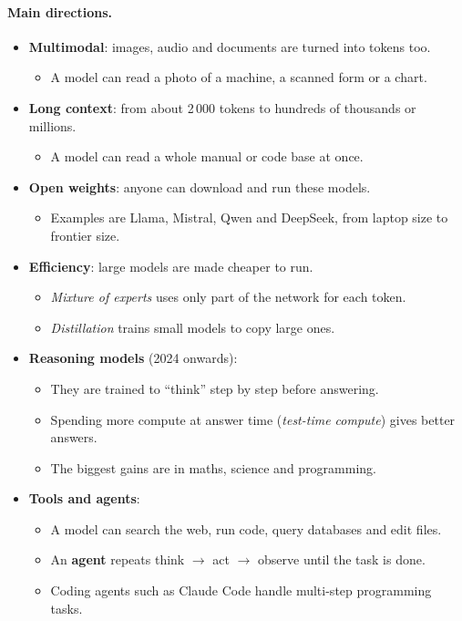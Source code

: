 \documentclass[12pt, a4paper]{article}
\begin{document}
\paragraph{Main directions.}
\begin{itemize}
  \item \textbf{Multimodal}: images, audio and documents are turned into
        tokens too.
        \begin{itemize}
          \item A model can read a photo of a machine, a scanned form or a
                chart.
        \end{itemize}
  \item \textbf{Long context}: from about 2\,000 tokens to hundreds of
        thousands or millions.
        \begin{itemize}
          \item A model can read a whole manual or code base at once.
        \end{itemize}
  \item \textbf{Open weights}: anyone can download and run these models.
        \begin{itemize}
          \item Examples are Llama, Mistral, Qwen and DeepSeek, from laptop
                size to frontier size.
        \end{itemize}
  \item \textbf{Efficiency}: large models are made cheaper to run.
        \begin{itemize}
          \item \emph{Mixture of experts} uses only part of the network for
                each token.
          \item \emph{Distillation} trains small models to copy large ones.
        \end{itemize}
  \item \textbf{Reasoning models} (2024 onwards):
        \begin{itemize}
          \item They are trained to ``think'' step by step before answering.
          \item Spending more compute at answer time (\emph{test-time
                compute}) gives better answers.
          \item The biggest gains are in maths, science and programming.
        \end{itemize}
  \item \textbf{Tools and agents}:
        \begin{itemize}
          \item A model can search the web, run code, query databases and
                edit files.
          \item An \textbf{agent} repeats think $\to$ act $\to$ observe until
                the task is done.
          \item Coding agents such as Claude Code handle multi-step
                programming tasks.
        \end{itemize}
\end{itemize}
\end{document}
